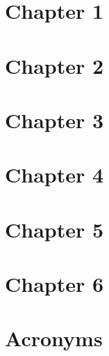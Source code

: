 \documentclass[12pt, a4paper]{article}
\begin{document}
\begin{multicols*}{2}
	\section{Chapter 1}
	
	
	\section{Chapter 2}
	
	
	
	\section{Chapter 3}
	
	
	
	\section{Chapter 4}
	
	
	\section{Chapter 5}
	
	
	\section{Chapter 6}
	
	
	\newpage
	\section{Acronyms}
	


\end{multicols*}	
\end{document}
